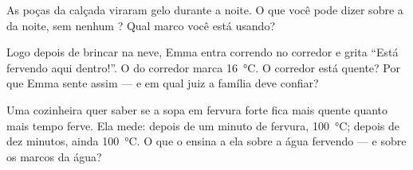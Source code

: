 \begin{exercise}[$\star$]\label{exo:g3:temperature-thermometers:9}
As poças da calçada viraram gelo durante a noite. O que você pode
dizer sobre a  da noite, sem nenhum ? Qual marco
você está usando?
\end{exercise}

\begin{exercise}[$\star\star$]\label{exo:g3:temperature-thermometers:10}
Logo depois de brincar na neve, Emma entra correndo no corredor e
grita ``Está fervendo aqui dentro!''. O  do corredor marca
\qty{16}{\celsius}. O corredor está quente? Por que Emma sente assim
--- e em qual juiz a família deve confiar?
\end{exercise}

\begin{exercise}[$\star\star$]\label{exo:g3:temperature-thermometers:11}
Uma cozinheira quer saber se a sopa em fervura forte fica mais quente
quanto mais tempo ferve. Ela mede: depois de um minuto de fervura,
\qty{100}{\celsius}; depois de dez minutos, ainda
\qty{100}{\celsius}. O que o  ensina a ela sobre a água
fervendo --- e sobre os marcos da água?
\end{exercise}
